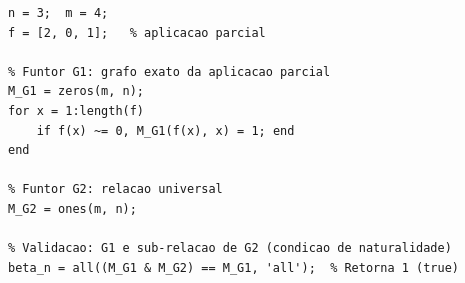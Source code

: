 \begin{lstlisting}[style=matlab, caption={Verificação da transformação natural $\beta: G_1 \Rightarrow G_2$ em $\mathbf{Par} \to \mathbf{Rel}$}]
n = 3;  m = 4;
f = [2, 0, 1];   % aplicacao parcial

% Funtor G1: grafo exato da aplicacao parcial
M_G1 = zeros(m, n);
for x = 1:length(f)
    if f(x) ~= 0, M_G1(f(x), x) = 1; end
end

% Funtor G2: relacao universal
M_G2 = ones(m, n);

% Validacao: G1 e sub-relacao de G2 (condicao de naturalidade)
beta_n = all((M_G1 & M_G2) == M_G1, 'all');  % Retorna 1 (true)
\end{lstlisting}